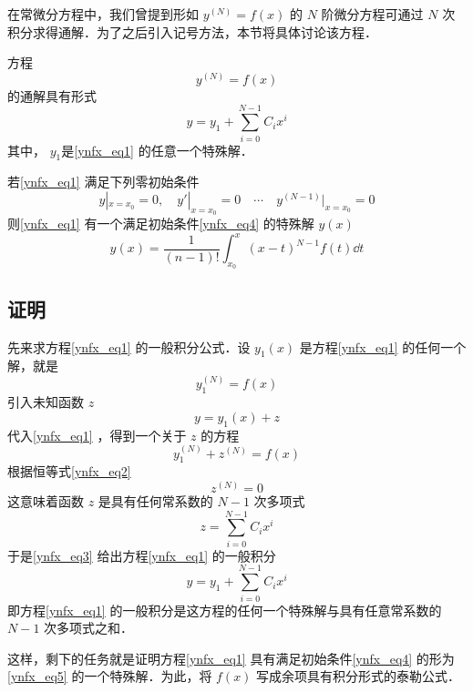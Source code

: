 在常微分方程中，我们曾提到形如 $y^{(N)}=f(x)$ 的 $N$ 阶微分方程可通过 $N$ 次积分求得通解．为了之后引入记号方法，本节将具体讨论该方程．

方程
\begin{equation}\label{ynfx_eq1}
y^{(N)}=f(x)
\end{equation}
的通解具有形式
\begin{equation}
y=y_1+\sum_{i=0}^{N-1}C_ix^i
\end{equation}
其中， $y_1$是\autoref{ynfx_eq1} 的任意一个特殊解．

若\autoref{ynfx_eq1} 满足下列零初始条件
\begin{equation}\label{ynfx_eq4}
y|_{x=x_0}=0,\quad y'|_{x=x_0}=0\quad\cdots \quad y^{(N-1)}|_{x=x_0}=0
\end{equation}
则\autoref{ynfx_eq1} 有一个满足初始条件\autoref{ynfx_eq4} 的特殊解 $y(x)$
\begin{equation}\label{ynfx_eq5}
y(x)=\frac{1}{(n-1)!}\int_{x_0}^x(x-t)^{N-1}f(t)\dd t
\end{equation}


\subsection{证明}
先来求方程\autoref{ynfx_eq1} 的一般积分公式．设 $y_1(x)$ 是方程\autoref{ynfx_eq1} 的任何一个解，就是
\begin{equation}\label{ynfx_eq2}
y_1^{(N)}=f(x)
\end{equation}
引入未知函数 $z$
\begin{equation}\label{ynfx_eq3}
y=y_1(x)+z
\end{equation}
代入\autoref{ynfx_eq1} ，得到一个关于 $z$ 的方程
\begin{equation}
y_1^{(N)}+z^{(N)}=f(x)
\end{equation}
根据恒等式\autoref{ynfx_eq2} 
\begin{equation}
z^{(N)}=0
\end{equation}
这意味着函数 $z$ 是具有任何常系数的 $N-1$ 次多项式
\begin{equation}
z=\sum_{i=0}^{N-1}C_ix^i
\end{equation}
于是\autoref{ynfx_eq3} 给出方程\autoref{ynfx_eq1} 的一般积分
\begin{equation}
y=y_1+\sum_{i=0}^{N-1}C_ix^i
\end{equation}
即方程\autoref{ynfx_eq1} 的一般积分是这方程的任何一个特殊解与具有任意常系数的 $N-1$ 次多项式之和．

这样，剩下的任务就是证明方程\autoref{ynfx_eq1} 具有满足初始条件\autoref{ynfx_eq4} 的形为\autoref{ynfx_eq5} 的一个特殊解．为此，将 $f(x)$ 写成余项具有积分形式的泰勒公式．